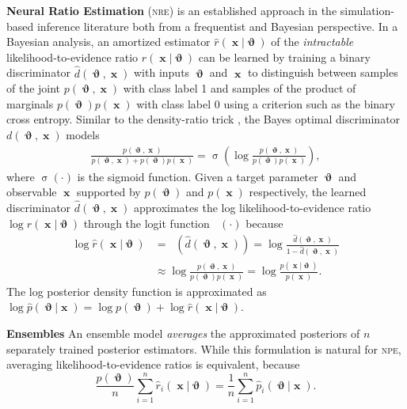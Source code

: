 \documentclass[twoside]{article}
\DeclareMathOperator{\logit}{\sigma^{-1}}
\DeclareMathOperator{\sigmoid}{\sigma}
\DeclareMathOperator{\vtheta}{\boldsymbol\vartheta}
\DeclareMathOperator{\vx}{\boldsymbol x}
\newcommand{\nre}{\textsc{nre}}
\begin{document}
{\bf Neural Ratio Estimation} (\nre) is an established approach in the simulation-based inference literature both from a frequentist \citep{cranmer2015approximating} and Bayesian \citep{thomas2016likelihood,2019arXiv190304057H} perspective. In a Bayesian analysis,
an amortized estimator $\hat{r}(\vx\vert\vtheta)$
of the \emph{intractable} likelihood-to-evidence ratio $r(\vx\vert\vtheta)$ can be learned by training a binary discriminator $\hat{d}(\vtheta,\vx)$ with inputs $\vtheta$ and $\vx$ to distinguish between samples of the
joint $p(\vtheta,\vx)$ with class label 1 and samples of the product of marginals $p(\vtheta)p(\vx)$ with class label 0 using a criterion such
as the binary cross entropy. Similar to the density-ratio trick \citep{sugiyama2012density,goodfellow2014generative,cranmer2015approximating,2019arXiv190304057H}, the Bayes optimal discriminator $d(\vtheta,\vx)$ models
\begin{align}
  \frac{p(\vtheta, \vx)}{p(\vtheta,\vx) + p(\vtheta)p(\vx)} = \sigmoid\left(\log\frac{p(\vtheta,\vx)}{p(\vtheta)p(\vx)}\right),
\end{align}
where $\sigmoid(\cdot)$ is the sigmoid function.
Given a target parameter $\vtheta$ and observable $\vx$ supported by $p(\vtheta)$ and $p(\vx)$ respectively,
the learned discriminator $\hat{d}(\vtheta,\vx)$ approximates the log likelihood-to-evidence ratio $\log r(\vx\vert\vtheta)$ through the logit function $\logit(\cdot)$ because
\begin{align}
  \log \hat{r}(\vx\vert\vtheta) &= \logit\left(\hat{d}(\vtheta,\vx)\right) = \log\frac{\hat{d}(\vtheta,\vx)}{1 - \hat{d}(\vtheta,\vx)}\\
  &\approx \log\frac{p(\vtheta, \vx)}{p(\vtheta)p(\vx)} = \log\frac{p(\vx\vert\vtheta)}{p(\vx)}.
\end{align}
The log posterior density function is approximated as $\log \hat{p}(\vtheta\vert\vx) = \log p(\vtheta) + \log \hat{r}(\vx\vert\vtheta)$.

{\bf Ensembles} An ensemble model \emph{averages} the approximated posteriors of $n$ separately trained posterior estimators. While this formulation is natural for \textsc{npe}, averaging likelihood-to-evidence ratios is equivalent, because
\begin{equation}
    \frac{p(\vtheta)}{n} \sum_{i=1}^n \hat{r}_i(\vx \vert \vtheta) = \frac{1}{n}\sum_{i=1}^n \hat{p}_i(\vtheta \vert \vx).
\end{equation}
\end{document}
